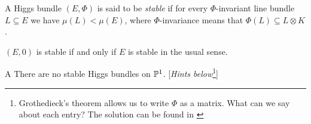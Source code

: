 \documentclass[A4paper, 12pt, british, reqno]{amsart}
\DeclareMathOperator{\Hom}{Hom}
\newcommand{\ot}{\otimes}
\newcommand{\op}{\oplus}
\begin{document}

\begin{udefn}[Stability]
    A Higgs bundle $(E,\Phi)$ is said to be \textit{stable} if for every $\Phi$-invariant line bundle $L\subseteq E$ we have $\mu(L)<\mu(E)$, where $\Phi$-invariance means that $\Phi(L)\subseteq L\ot K$.
\end{udefn}

\begin{urem}
    $(E,0)$ is stable if and only if $E$ is stable in the usual sense.
\end{urem}

\begin{cexe}{A}
    There are no stable Higgs bundles on $\P^{1}$.
    [\textit{Hints below}\footnote{Grothedieck's theorem allows us to write $\Phi$ as a matrix.
    What can we say about each entry?
    The solution can be found in \cite[Remark (3.2) (iii)]{hit87a}}]
\end{cexe}

\end{document}
